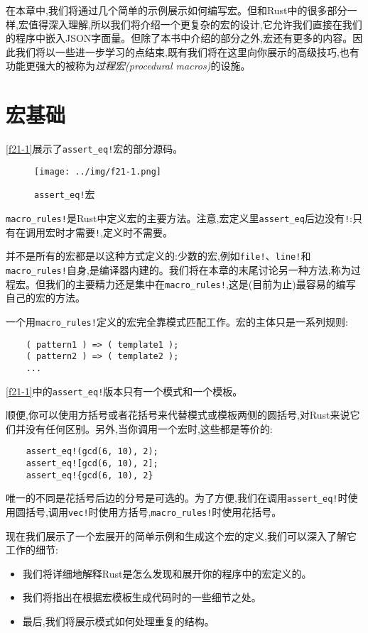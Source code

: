 在本章中,我们将通过几个简单的示例展示如何编写宏。但和Rust中的很多部分一样,宏值得深入理解,所以我们将介绍一个更复杂的宏的设计,它允许我们直接在我们的程序中嵌入JSON字面量。但除了本书中介绍的部分之外,宏还有更多的内容。因此我们将以一些进一步学习的点结束,既有我们将在这里向你展示的高级技巧,也有功能更强大的被称为\emph{过程宏(procedural macros)}的设施。

\section{宏基础}
\autoref{f21-1}展示了\texttt{assert\_eq!}宏的部分源码。

\begin{figure}[htbp]
    \centering
    \texttt{[image: ../img/f21-1.png]}
    \caption{\texttt{assert\_eq!}宏}
    \label{f21-1}
\end{figure}

\texttt{macro\_rules!}是Rust中定义宏的主要方法。注意,宏定义里\texttt{assert\_eq}后边没有\texttt{!}:只有在调用宏时才需要\texttt{!},定义时不需要。

并不是所有的宏都是以这种方式定义的:少数的宏,例如\texttt{file!}、\texttt{line!}和\texttt{macro\_rules!}自身,是编译器内建的。我们将在本章的末尾讨论另一种方法,称为过程宏。但我们的主要精力还是集中在\texttt{macro\_rules!},这是(目前为止)最容易的编写自己的宏的方法。

一个用\texttt{macro\_rules!}定义的宏完全靠模式匹配工作。宏的主体只是一系列规则:
\begin{verbatim}
    ( pattern1 ) => ( template1 );
    ( pattern2 ) => ( template2 );
    ...
\end{verbatim}

\autoref{f21-1}中的\texttt{assert\_eq!}版本只有一个模式和一个模板。

顺便,你可以使用方括号或者花括号来代替模式或模板两侧的圆括号,对Rust来说它们并没有任何区别。另外,当你调用一个宏时,这些都是等价的:
\begin{verbatim}
    assert_eq!(gcd(6, 10), 2);
    assert_eq![gcd(6, 10), 2];
    assert_eq!{gcd(6, 10), 2}
\end{verbatim}

唯一的不同是花括号后边的分号是可选的。为了方便,我们在调用\texttt{assert\_eq!}时使用圆括号,调用\texttt{vec!}时使用方括号,\texttt{macro\_rules!}时使用花括号。

现在我们展示了一个宏展开的简单示例和生成这个宏的定义,我们可以深入了解它工作的细节:
\begin{itemize}
    \item 我们将详细地解释Rust是怎么发现和展开你的程序中的宏定义的。
    \item 我们将指出在根据宏模板生成代码时的一些细节之处。
    \item 最后,我们将展示模式如何处理重复的结构。
\end{itemize}

